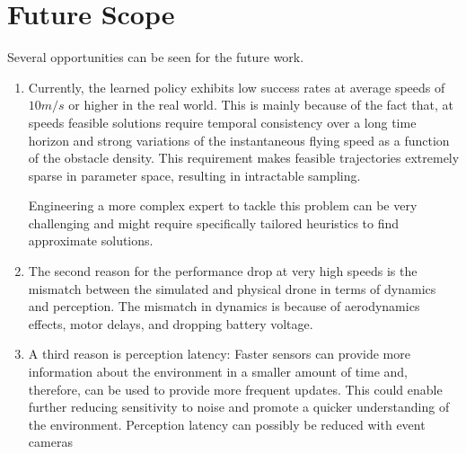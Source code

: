 \section{Future Scope}
Several opportunities can be seen for the future work. 
\begin{enumerate}
	\item Currently, the learned
policy exhibits low success rates at average speeds of $10 m/s$ or
higher in the real world. This is mainly because of the fact that,
at speeds feasible solutions require temporal
consistency over a long time horizon and strong variations of the instantaneous flying speed as a function of the obstacle density. This
requirement makes feasible trajectories extremely sparse in parameter
space, resulting in intractable sampling. 
	
	Engineering a more complex
expert to tackle this problem can be very challenging and might require
specifically tailored heuristics to find approximate solutions. 
	
	\item The second reason for the performance drop at very
high speeds is the mismatch between the simulated and physical drone
in terms of dynamics and perception. The mismatch in dynamics is
because of aerodynamics effects, motor delays, and dropping battery
voltage.
	
	\item A third reason is
perception latency: Faster sensors can provide more information about
the environment in a smaller amount of time and, therefore, can be
used to provide more frequent updates. This could enable further reducing sensitivity to noise
and promote a quicker understanding of the environment. Perception
latency can possibly be reduced with event cameras
\end{enumerate}